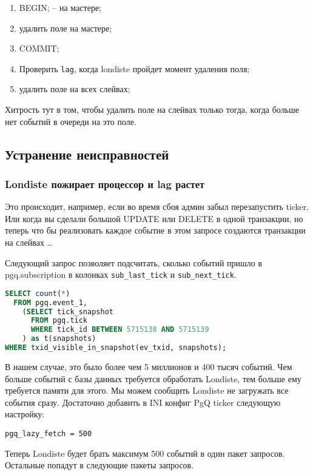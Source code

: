 \begin{enumerate}
 \item BEGIN; -- на мастере;
 \item удалить поле на мастере;
 \item COMMIT;
 \item Проверить \lstinline!lag!, когда londiste пройдет момент удаления поля;
 \item удалить поле на всех слейвах;
\end{enumerate}

Хитрость тут в том, чтобы удалить поле на слейвах только тогда, когда больше нет событий в очереди на это поле.


\subsection{Устранение неисправностей}

\subsubsection{Londiste пожирает процессор и lag растет}

Это происходит, например, если во время сбоя админ забыл перезапустить ticker. Или когда вы сделали большой UPDATE или DELETE в одной транзакции, но теперь что бы реализовать каждое событие в этом запросе создаются транзакции на слейвах \dots

Следующий запрос позволяет подсчитать, сколько событий пришло в pgq.subscription в колонках \lstinline!sub_last_tick! и \lstinline!sub_next_tick!.

\begin{lstlisting}[language=SQL,label=lst:londiste24,caption=Устранение неисправностей]
SELECT count(*)
  FROM pgq.event_1,
    (SELECT tick_snapshot
      FROM pgq.tick
      WHERE tick_id BETWEEN 5715138 AND 5715139
    ) as t(snapshots)
WHERE txid_visible_in_snapshot(ev_txid, snapshots);
\end{lstlisting}

В нашем случае, это было более чем 5 миллионов и 400 тысяч событий. Чем больше событий с базы данных требуется обработать Londiste, тем больше ему требуется памяти для этого. Мы можем сообщить Londiste не загружать все события сразу. Достаточно добавить в INI конфиг PgQ ticker следующую настройку:

\begin{lstlisting}[label=lst:londiste25,caption=Устранение неисправностей]
pgq_lazy_fetch = 500
\end{lstlisting}

Теперь Londiste будет брать максимум 500 событий в один пакет запросов. Остальные попадут в следующие пакеты запросов.